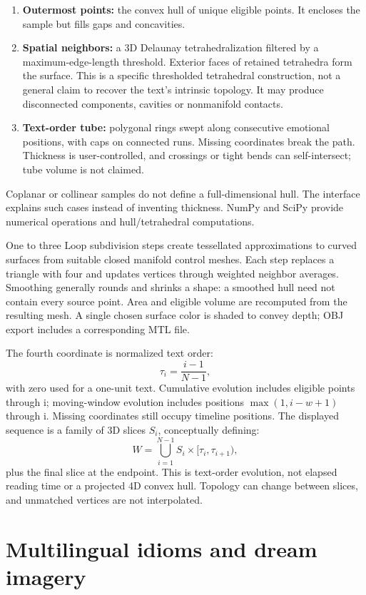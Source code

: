 \documentclass[manuscript,screen,nonacm]{acmart}
\providecommand{\tightlist}{\setlength{\itemsep}{0pt}\setlength{\parskip}{0pt}}
\begin{document}
\begin{enumerate}
\def\labelenumi{\arabic{enumi}.}
\tightlist
\item
  \textbf{Outermost points:} the convex hull of unique eligible points.
  It encloses the sample but fills gaps and concavities.
\item
  \textbf{Spatial neighbors:} a 3D Delaunay tetrahedralization filtered
  by a maximum-edge-length threshold. Exterior faces of retained
  tetrahedra form the surface. This is a specific thresholded
  tetrahedral construction, not a general claim to recover the text's
  intrinsic topology. It may produce disconnected components, cavities
  or nonmanifold contacts.
\item
  \textbf{Text-order tube:} polygonal rings swept along consecutive
  emotional positions, with caps on connected runs. Missing coordinates
  break the path. Thickness is user-controlled, and crossings or tight
  bends can self-intersect; tube volume is not claimed.
\end{enumerate}

Coplanar or collinear samples do not define a full-dimensional hull. The
interface explains such cases instead of inventing thickness. NumPy and
SciPy provide numerical operations and hull/tetrahedral computations.

One to three Loop subdivision steps create tessellated approximations to
curved surfaces from suitable closed manifold control meshes. Each step
replaces a triangle with four and updates vertices through weighted
neighbor averages. Smoothing generally rounds and shrinks a shape: a
smoothed hull need not contain every source point. Area and eligible
volume are recomputed from the resulting mesh. A single chosen surface
color is shaded to convey depth; OBJ export includes a corresponding MTL
file.

The fourth coordinate is normalized text order:
\[\tau_i=\frac{i-1}{N-1},\]
with zero used for a one-unit text. Cumulative evolution includes
eligible points through i; moving-window evolution includes positions
\(\max(1,i-w+1)\) through i. Missing coordinates still occupy timeline
positions. The displayed sequence is a family of 3D slices \(S_i\),
conceptually defining:
\[W=\bigcup_{i=1}^{N-1}S_i\times[\tau_i,\tau_{i+1}),\]
plus the final slice at the endpoint. This is text-order evolution, not
elapsed reading time or a projected 4D convex hull. Topology can change
between slices, and unmatched vertices are not interpolated.


\section{Multilingual idioms and dream
imagery}\label{multilingual-idioms-and-dream-imagery}
\end{document}
